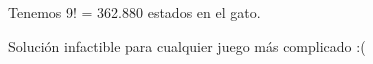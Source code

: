 \documentclass[preview]{standalone}
\begin{document}
\begin{center}
\quad Tenemos 9! = 362.880 estados en el gato.
         
         Solución infactible para cualquier juego más complicado :(
\end{center}
\end{document}
